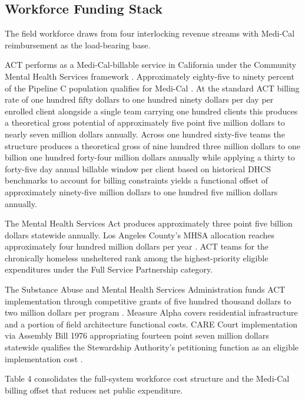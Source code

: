 \documentclass[12pt, letterpaper]{article}
\begin{document}
\clearpage

\subsection{Workforce Funding Stack}

The field workforce draws from four interlocking revenue streams with Medi-Cal reimbursement as the load-bearing base.

ACT performs as a Medi-Cal-billable service in California under the Community Mental Health Services framework \citep{medi_cal_act_2024}. Approximately eighty-five to ninety percent of the Pipeline C population qualifies for Medi-Cal \citep{ucsf_bhhi_2023}. At the standard ACT billing rate of one hundred fifty dollars to one hundred ninety dollars per day per enrolled client alongside a single team carrying one hundred clients this produces a theoretical gross potential of approximately five point five million dollars to nearly seven million dollars annually. Across one hundred sixty-five teams the structure produces a theoretical gross of nine hundred three million dollars to one billion one hundred forty-four million dollars annually while applying a thirty to forty-five day annual billable window per client based on historical DHCS benchmarks to account for billing constraints \citep{dhcs_act_utilization_2024} yields a functional offset of approximately ninety-five million dollars to one hundred five million dollars annually.

The Mental Health Services Act produces approximately three point five billion dollars statewide annually. Los Angeles County's MHSA allocation reaches approximately four hundred million dollars per year \citep{mhsa_2024}. ACT teams for the chronically homeless unsheltered rank among the highest-priority eligible expenditures under the Full Service Partnership category.

The Substance Abuse and Mental Health Services Administration funds ACT implementation through competitive grants of five hundred thousand dollars to two million dollars per program \citep{samhsa_act_2024}. Measure Alpha covers residential infrastructure and a portion of field architecture functional costs. CARE Court implementation via Assembly Bill 1976 appropriating fourteen point seven million dollars statewide qualifies the Stewardship Authority's petitioning function as an eligible implementation cost \citep{ab_1976_2024}.

\clearpage

Table 4 consolidates the full-system workforce cost structure and the Medi-Cal billing offset that reduces net public expenditure.
\end{document}
